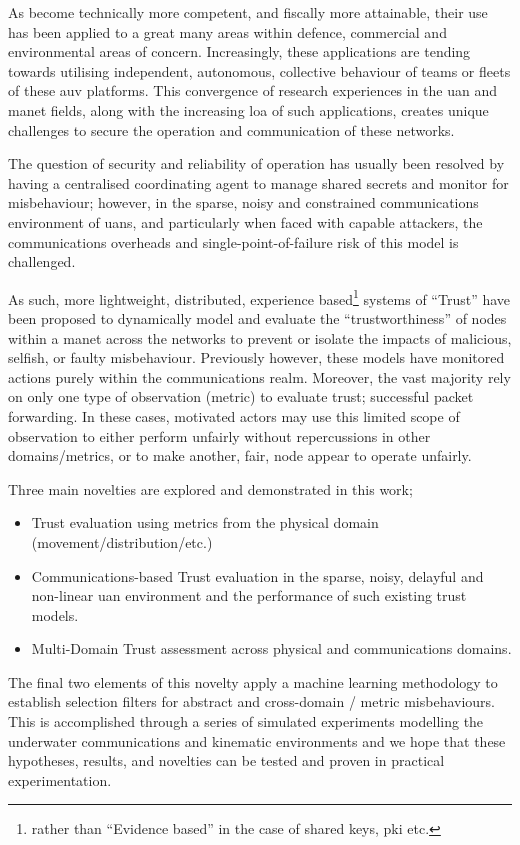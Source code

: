 As  become technically more competent, and fiscally more attainable, their use has been applied to a great many areas within defence, commercial and environmental areas of concern. 
Increasingly, these applications are tending towards utilising independent, autonomous, collective behaviour of teams or fleets of these \gls{auv} platforms.
This convergence of research experiences in the \acrfull{uan} and \gls{manet} fields, along with the increasing \gls{loa} of such applications, creates unique challenges to secure the operation and communication of these networks.

The question of security and reliability of operation has usually been resolved by having a centralised coordinating agent to manage shared secrets and monitor for misbehaviour; however, in the sparse, noisy and constrained communications environment of \glspl{uan}, and particularly when faced with capable attackers, the communications overheads and single-point-of-failure risk of this model is challenged.

As such, more lightweight, distributed, experience based\footnote{rather than ``Evidence based'' in the case of shared keys, \gls{pki} etc.} systems of ``Trust'' have been proposed to dynamically model and evaluate the ``trustworthiness'' of nodes within a \gls{manet} across the networks to prevent or isolate the impacts of malicious, selfish, or faulty misbehaviour. 
Previously however, these models have monitored actions purely within the communications realm. 
Moreover, the vast majority rely on only one type of observation (metric) to evaluate trust; successful packet forwarding.
In these cases, motivated actors may use this limited scope of observation to either perform unfairly without repercussions in other domains/metrics, or to make another, fair, node appear to operate unfairly.

Three main novelties are explored and demonstrated in this work;
\begin{itemize}
	\item Trust evaluation using metrics from the physical domain (movement/distribution/etc.)
	\item Communications-based Trust evaluation in the sparse, noisy, delayful and non-linear \gls{uan} environment and the performance of such existing trust models.
	\item Multi-Domain Trust assessment across physical and communications domains.
\end{itemize}

The final two elements of this novelty apply a machine learning methodology to establish selection filters for abstract and cross-domain / metric misbehaviours.
This is accomplished through a series of simulated experiments modelling the underwater communications and kinematic environments and we hope that these hypotheses, results, and novelties can be tested and proven in practical experimentation.

